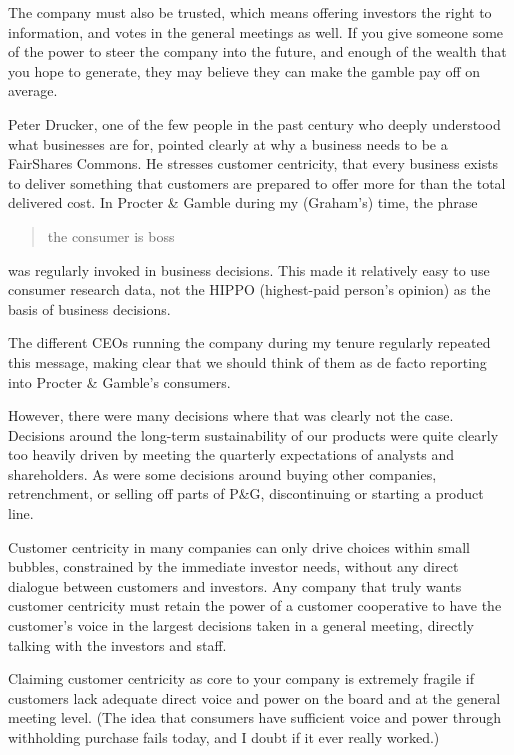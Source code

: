 The company must also be  trusted, which means offering investors the right to information, and votes in the general meetings as well. If you give someone some of the power to steer the company into the future, and enough of the wealth that you hope to generate, they may believe they can make the gamble pay off on average. 


Peter Drucker, one of the few people in the past century who deeply understood what businesses are for, pointed clearly at why a business needs to be a FairShares Commons. He stresses customer centricity, that every business exists to deliver something that customers are prepared to offer more for than the total delivered cost.  In Procter \& Gamble during my (Graham’s) time, the phrase 
\begin{quote} 
the consumer is boss
\end{quote} 
was regularly invoked in business decisions. This made it relatively easy to use consumer research data, not the HIPPO (highest-paid person’s opinion) as the basis of business decisions. 


The different CEOs running the company during my tenure regularly repeated this message, making clear that we should think of them as de facto reporting into Procter \& Gamble's consumers.


However, there were many decisions where that was clearly not the case. Decisions around the long-term sustainability of our products were quite clearly too heavily driven by meeting the quarterly expectations of analysts and shareholders. As were some decisions around buying other companies, retrenchment, or selling off parts of P\&G, discontinuing or starting a product line.


Customer centricity in many companies can only drive choices within small bubbles, constrained by the immediate investor needs, without any direct dialogue between customers and investors. Any company that truly wants customer centricity must retain the power of a customer cooperative to have the customer’s voice in the largest decisions taken in a general meeting, directly talking with the investors and staff. 


Claiming customer centricity as core to your company is extremely fragile if customers lack adequate direct voice and power on the board and at the general meeting level. (The idea that consumers have sufficient voice and power through withholding purchase fails today, and I doubt if it ever really worked.) 


